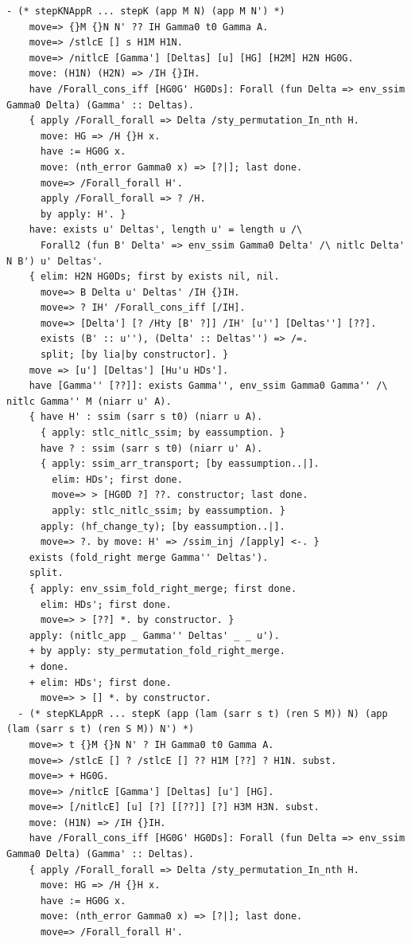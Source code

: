 \documentclass[10pt,a4paper]{article}
\begin{document}
\begin{lstlisting}[style=authorcoq]
  - (* stepKNAppR ... stepK (app M N) (app M N') *)
    move=> {}M {}N N' ?? IH Gamma0 t0 Gamma A.
    move=> /stlcE [] s H1M H1N.
    move=> /nitlcE [Gamma'] [Deltas] [u] [HG] [H2M] H2N HG0G.
    move: (H1N) (H2N) => /IH {}IH.
    have /Forall_cons_iff [HG0G' HG0Ds]: Forall (fun Delta => env_ssim Gamma0 Delta) (Gamma' :: Deltas).
    { apply /Forall_forall => Delta /sty_permutation_In_nth H.
      move: HG => /H {}H x.
      have := HG0G x.
      move: (nth_error Gamma0 x) => [?|]; last done.
      move=> /Forall_forall H'.
      apply /Forall_forall => ? /H.
      by apply: H'. }
    have: exists u' Deltas', length u' = length u /\
      Forall2 (fun B' Delta' => env_ssim Gamma0 Delta' /\ nitlc Delta' N B') u' Deltas'.
    { elim: H2N HG0Ds; first by exists nil, nil.
      move=> B Delta u' Deltas' /IH {}IH.
      move=> ? IH' /Forall_cons_iff [/IH].
      move=> [Delta'] [? /Hty [B' ?]] /IH' [u''] [Deltas''] [??].
      exists (B' :: u''), (Delta' :: Deltas'') => /=.
      split; [by lia|by constructor]. }
    move => [u'] [Deltas'] [Hu'u HDs'].
    have [Gamma'' [??]]: exists Gamma'', env_ssim Gamma0 Gamma'' /\ nitlc Gamma'' M (niarr u' A).
    { have H' : ssim (sarr s t0) (niarr u A).
      { apply: stlc_nitlc_ssim; by eassumption. }
      have ? : ssim (sarr s t0) (niarr u' A).
      { apply: ssim_arr_transport; [by eassumption..|].
        elim: HDs'; first done.
        move=> > [HG0D ?] ??. constructor; last done.
        apply: stlc_nitlc_ssim; by eassumption. }
      apply: (hf_change_ty); [by eassumption..|].
      move=> ?. by move: H' => /ssim_inj /[apply] <-. }
    exists (fold_right merge Gamma'' Deltas').
    split.
    { apply: env_ssim_fold_right_merge; first done.
      elim: HDs'; first done.
      move=> > [??] *. by constructor. }
    apply: (nitlc_app _ Gamma'' Deltas' _ _ u').
    + by apply: sty_permutation_fold_right_merge.
    + done.
    + elim: HDs'; first done.
      move=> > [] *. by constructor.
  - (* stepKLAppR ... stepK (app (lam (sarr s t) (ren S M)) N) (app (lam (sarr s t) (ren S M)) N') *)
    move=> t {}M {}N N' ? IH Gamma0 t0 Gamma A.
    move=> /stlcE [] ? /stlcE [] ?? H1M [??] ? H1N. subst.
    move=> + HG0G.
    move=> /nitlcE [Gamma'] [Deltas] [u'] [HG].
    move=> [/nitlcE] [u] [?] [[??]] [?] H3M H3N. subst.
    move: (H1N) => /IH {}IH.
    have /Forall_cons_iff [HG0G' HG0Ds]: Forall (fun Delta => env_ssim Gamma0 Delta) (Gamma' :: Deltas).
    { apply /Forall_forall => Delta /sty_permutation_In_nth H.
      move: HG => /H {}H x.
      have := HG0G x.
      move: (nth_error Gamma0 x) => [?|]; last done.
      move=> /Forall_forall H'.

\end{lstlisting}
\end{document}
